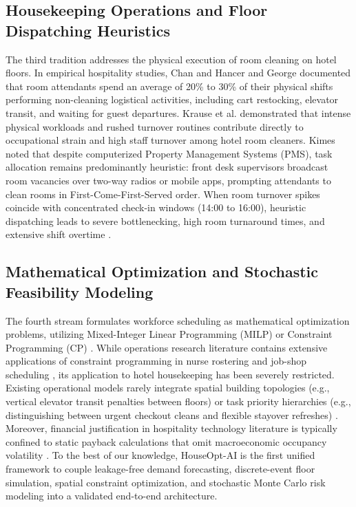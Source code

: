 \documentclass[11pt,a4paper]{article}
\begin{document}
\subsection{Housekeeping Operations and Floor Dispatching Heuristics}
The third tradition addresses the physical execution of room cleaning on hotel floors. In empirical hospitality studies, Chan \cite{chan2013} and Hancer and George \cite{hancer2003} documented that room attendants spend an average of 20\% to 30\% of their physical shifts performing non-cleaning logistical activities, including cart restocking, elevator transit, and waiting for guest departures. Krause et al. \cite{krause2005} demonstrated that intense physical workloads and rushed turnover routines contribute directly to occupational strain and high staff turnover among hotel room cleaners. Kimes \cite{kimes2004} noted that despite computerized Property Management Systems (PMS), task allocation remains predominantly heuristic: front desk supervisors broadcast room vacancies over two-way radios or mobile apps, prompting attendants to clean rooms in First-Come-First-Served order. When room turnover spikes coincide with concentrated check-in windows (14:00 to 16:00), heuristic dispatching leads to severe bottlenecking, high room turnaround times, and extensive shift overtime \cite{krause2005,ernst2004}.

\subsection{Mathematical Optimization and Stochastic Feasibility Modeling}
The fourth stream formulates workforce scheduling as mathematical optimization problems, utilizing Mixed-Integer Linear Programming (MILP) or Constraint Programming (CP) \cite{ernst2004,burke2004,trilling2006}. While operations research literature contains extensive applications of constraint programming in nurse rostering and job-shop scheduling \cite{burke2004,trilling2006,baptiste2001}, its application to hotel housekeeping has been severely restricted. Existing operational models rarely integrate spatial building topologies (e.g., vertical elevator transit penalties between floors) or task priority hierarchies (e.g., distinguishing between urgent checkout cleans and flexible stayover refreshes) \cite{baptiste2001,perron2011}. Moreover, financial justification in hospitality technology literature is typically confined to static payback calculations that omit macroeconomic occupancy volatility \cite{ivanov2019,sainaghi2019}. To the best of our knowledge, HouseOpt-AI is the first unified framework to couple leakage-free demand forecasting, discrete-event floor simulation, spatial constraint optimization, and stochastic Monte Carlo risk modeling into a validated end-to-end architecture.
\end{document}
